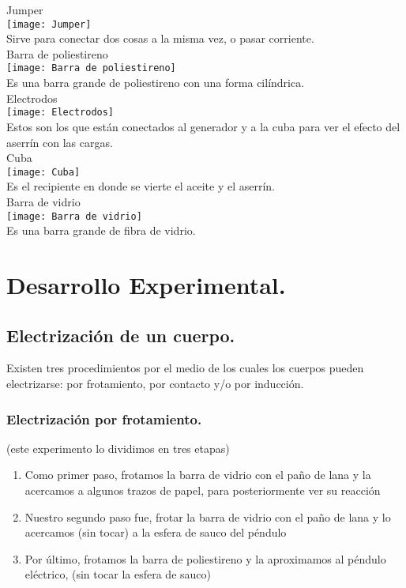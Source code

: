 \documentclass[spanish,10pt,a4paper,onecolumn]{article}
\begin{document}
Jumper \\

\texttt{[image: Jumper]}\\
Sirve para conectar dos cosas a la misma vez, o pasar corriente. \\

Barra de poliestireno \\

\texttt{[image: Barra de poliestireno]}\\
Es una barra grande de poliestireno con una forma cilíndrica. \\

\newpage
Electrodos \\

\texttt{[image: Electrodos]}\\
Estos son los que están conectados al generador y a la cuba para ver el efecto del aserrín con las cargas. \\ 

Cuba \\

\texttt{[image: Cuba]}\\
Es el recipiente en donde se vierte el aceite y el aserrín.\\  

Barra de vidrio \\

\texttt{[image: Barra de vidrio]}\\
Es una barra grande de fibra de vidrio.

	\section{Desarrollo Experimental.}
\subsection{Electrización de un cuerpo.}
Existen tres procedimientos por el medio de los cuales los cuerpos pueden electrizarse: por frotamiento, por contacto y/o por inducción. 

\subsubsection{Electrización por frotamiento.}
(este experimento lo dividimos en tres etapas) 
\begin{enumerate}
	\item Como primer paso, frotamos la barra de vidrio con el paño de lana y la acercamos a algunos trazos de papel, para posteriormente ver su reacción 
	\item Nuestro segundo paso fue, frotar la barra de vidrio con el paño de lana y lo acercamos (sin tocar) a la esfera de sauco del péndulo 
	\item Por último, frotamos la barra de poliestireno y la aproximamos al péndulo eléctrico, (sin tocar la esfera de sauco)
\end{enumerate}
\end{document}
